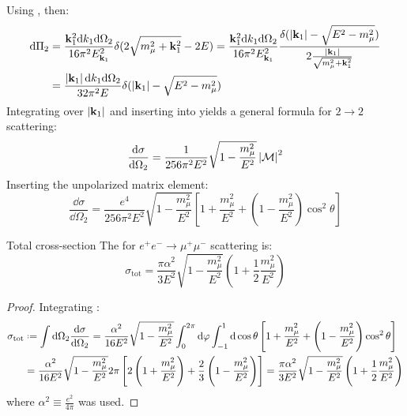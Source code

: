 Using , then:
\begin{equation*}
  \begin{split}
    \mathrm{d} \Pi_2
    & = \frac{\mathbf{k}_1^2 \mathrm{d} k_1 \mathrm{d} \Omega_2}{16 \pi^2 E_{\mathbf{k}_1}^2} \delta(2 \sqrt{m_\mu^2 + \mathbf{k}_1^2} - 2E) = \frac{\mathbf{k}_1^2 \mathrm{d} k_1 \mathrm{d} \Omega_2}{16 \pi^2 E_{\mathbf{k}_1}^2} \frac{\delta(\left\lvert\mathbf{k}_1\right\rvert - \sqrt{E^2 - m_\mu^2})}{2 \frac{\left\lvert\mathbf{k}_1\right\rvert}{\sqrt{m_\mu^2 + \mathbf{k}_1^2}}} \\
    & = \frac{\left\lvert\mathbf{k}_1\right\rvert \mathrm{d} k_1 \mathrm{d} \Omega_2}{32 \pi^2 E} \delta(\left\lvert\mathbf{k}_1\right\rvert - \sqrt{E^2 - m_\mu^2})
  \end{split}
\end{equation*}
Integrating over $ \left\lvert\mathbf{k}_1\right\rvert $ and inserting into  yields a general formula for $ 2 \rightarrow 2 $ scattering:
\begin{equation}
  \frac{\mathrm{d}\sigma}{\mathrm{d}\Omega_2} = \frac{1}{256\pi^2 E^2} \sqrt{1 - \frac{m_\mu^2}{E^2}} \left\lvert\mathcal{M}\right\rvert^2
\end{equation}
Inserting the unpolarized matrix element:
\begin{equation}
  \frac{\dd\sigma}{\dd\Omega_2} = \frac{e^4}{256\pi^2 E^2} \sqrt{1 - \frac{m_\mu^2}{E^2}} \left[ 1 + \frac{m_\mu^2}{E^2} + \left( 1 - \frac{m_\mu^2}{E^2} \right) \cos^2 \theta \right]
  \label{eq:unp-cr-sec}
\end{equation}

\begin{proposition}{Total cross-section}{}
  The  for $ e^+ e^- \rightarrow \mu^+ \mu^- $ scattering is:
  \begin{equation}
    \sigma_\text{tot} = \frac{\pi \alpha^2}{3E^2} \sqrt{1 - \frac{m_\mu^2}{E^2}} \left( 1 + \frac{1}{2} \frac{m_\mu^2}{E^2} \right)
  \end{equation}
\end{proposition}

\begin{proofbox}
  \begin{proof}
    Integrating :
    \begin{equation*}
      \begin{split}
        \sigma_\text{tot}
        &\defeq \int \dd\Omega_2 \frac{\dd\sigma}{\dd\Omega_2} = \frac{\alpha^2}{16E^2} \sqrt{1 - \frac{m_\mu^2}{E^2}} \int_{0}^{2\pi} \dd\varphi \int_{-1}^{1} \dd \cos \theta \left[ 1 + \frac{m_\mu^2}{E^2} + \left( 1 - \frac{m_\mu^2}{E^2} \right) \cos^2 \theta \right] \\
        &= \frac{\alpha^2}{16E^2} \sqrt{1 - \frac{m_\mu^2}{E^2}} 2\pi \left[ 2 \left( 1 + \frac{m_\mu^2}{E^2} \right) + \frac{2}{3} \left( 1 - \frac{m_\mu^2}{E^2} \right) \right] = \frac{\pi \alpha^2}{3E^2} \sqrt{1 - \frac{m_\mu^2}{E^2}} \left( 1 + \frac{1}{2} \frac{m_\mu^2}{E^2} \right)
      \end{split}
    \end{equation*}
    where $ \alpha^2 \equiv \frac{e^2}{4\pi} $ was used.
  \end{proof}
\end{proofbox}

